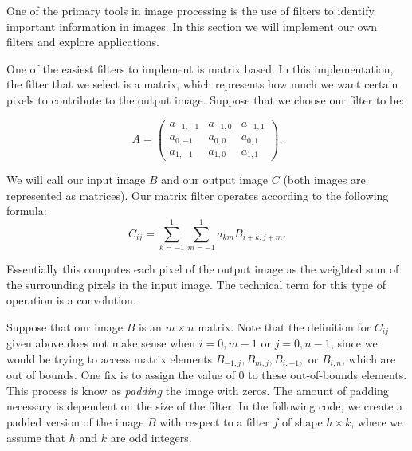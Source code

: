 
One of the primary tools in image processing is the use of filters to identify important information 
in images. In this section we will implement our own filters and explore applications.

One of the easiest filters to implement is matrix based. In this implementation, the filter that we 
select is a matrix, which represents how much we want certain pixels to contribute to the output image. 
Suppose that we choose our filter to be:

\[
A = \begin{pmatrix}
a_{-1,-1}&a_{-1,0}&a_{-1,1}\\
a_{0,-1}&a_{0,0}&a_{0,1}\\
a_{1,-1}&a_{1,0}&a_{1,1}
\end{pmatrix}.
\]

We will call our input image $B$ and our output image $C$ (both images are represented as matrices).
Our matrix filter operates according to the following formula:
\[
C_{ij} = \sum_{k=-1}^1 \sum_{m=-1}^1 a_{km}B_{i+k,j+m}.
\]

Essentially this computes each pixel of the output image as the weighted sum of the surrounding
pixels in the input image. The technical term for this type of operation is a convolution.

Suppose that our image $B$ is an $m\times n$ matrix. Note that the definition for
$C_{ij}$ given above does not make sense when $i = 0, m-1$ or $j = 0, n-1$, since we would be trying
to access matrix elements $B_{-1,j}, B_{m,j}, B_{i,-1},$ or $B_{i,n}$, which are out of bounds.
One fix is to assign the value of 0 to these out-of-bounds elements. This process is know as \emph{padding}
the image with zeros. The amount of padding necessary is dependent on the size of the filter.
In the following code, we create a padded version of the image $B$ with respect to a filter $f$ of shape 
$h\times k$, where we assume that $h$ and $k$ are odd integers.


